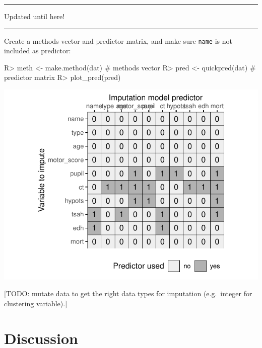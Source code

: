 \documentclass[
]{jss}
\begin{document}
\begin{center}\rule{0.5\linewidth}{0.5pt}\end{center}

\begin{center}

Updated until here!

\end{center}

\begin{center}\rule{0.5\linewidth}{0.5pt}\end{center}

Create a methods vector and predictor matrix, and make sure
\texttt{name} is not included as predictor:

\begin{CodeChunk}
\begin{CodeInput}
R> meth <- make.method(dat) # methods vector
R> pred <- quickpred(dat)   # predictor matrix
R> plot_pred(pred)
\end{CodeInput}


\begin{center}\includegraphics{Imputation_of_Incomplete_Multilevel_Data_files/figure-latex/ignore-1} \end{center}

\end{CodeChunk}

{[}TODO: mutate data to get the right data types for imputation
(e.g.~integer for clustering variable).{]}

\hypertarget{discussion}{%
\section{Discussion}\label{discussion}}
\end{document}
